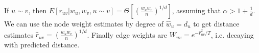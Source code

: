 If $u \sim v$, then  $E[r_{uv} | w_u, w_v, u \sim v] = \Theta \left [ \left ( \frac{w_u w_v}{n} \right )^{1/d} \right ]$, assuming that $\alpha > 1 + \frac{1}{d}$. We can use the node weight estimates by degree of $\hat{w}_u = d_u$ to get distance estimates $\hat{r}_{uv} = \left ( \frac{w_u w_v}{n} \right )^{1/d}$. Finally edge weights are $W_{uv} = e^{-\hat{r}_{uv}^2 / T}$, i.e. decaying with predicted distance.



